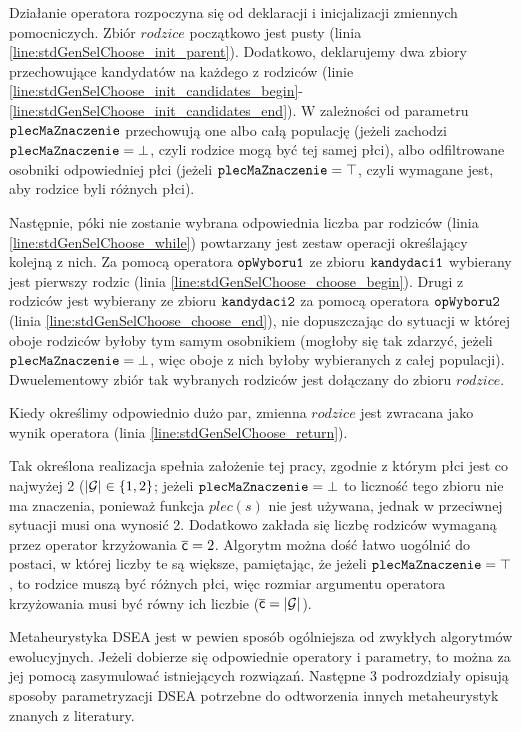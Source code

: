 \documentclass[./FM_mgr.tex]{subfiles}
\begin{document}
Działanie operatora rozpoczyna się od deklaracji i inicjalizacji zmiennych pomocniczych.
Zbiór $rodzice$ początkowo jest pusty (linia \ref{line:stdGenSelChoose_init_parent}).
Dodatkowo, deklarujemy dwa zbiory przechowujące kandydatów na każdego z rodziców (linie \ref{line:stdGenSelChoose_init_candidates_begin}-\ref{line:stdGenSelChoose_init_candidates_end}).
W zależności od parametru $\mathtt{plecMaZnaczenie}$ przechowują one albo całą populację (jeżeli zachodzi $\mathtt{plecMaZnaczenie} = \bot$, czyli rodzice mogą być tej samej płci), albo odfiltrowane osobniki odpowiedniej płci (jeżeli $\mathtt{plecMaZnaczenie} = \top$, czyli wymagane jest, aby rodzice byli różnych płci).

Następnie, póki nie zostanie wybrana odpowiednia liczba par rodziców (linia \ref{line:stdGenSelChoose_while}) powtarzany jest zestaw operacji określający kolejną z nich.
Za pomocą operatora $\mathtt{opWyboru1}$ ze zbioru $\mathtt{kandydaci1}$ wybierany jest pierwszy rodzic (linia \ref{line:stdGenSelChoose_choose_begin}).
Drugi z rodziców jest wybierany ze zbioru $\mathtt{kandydaci2}$ za pomocą operatora $\mathtt{opWyboru2}$  (linia \ref{line:stdGenSelChoose_choose_end}), nie dopuszczając do sytuacji w której oboje rodziców byłoby tym samym osobnikiem (mogłoby się tak zdarzyć, jeżeli $\mathtt{plecMaZnaczenie} = \bot$, więc oboje z nich byłoby wybieranych z całej populacji).
Dwuelementowy zbiór tak wybranych rodziców jest dołączany do zbioru $rodzice$.


Kiedy określimy odpowiednio dużo par, zmienna $rodzice$ jest zwracana jako wynik operatora (linia \ref{line:stdGenSelChoose_return}).

Tak określona realizacja spełnia założenie tej pracy, zgodnie z którym płci jest co najwyżej 2 ($|\mathcal{G}| \in \{ 1, 2 \}$; jeżeli $\mathtt{plecMaZnaczenie} = \bot$ to liczność tego zbioru nie ma znaczenia, ponieważ funkcja $plec(s)$ nie jest używana, jednak w przeciwnej sytuacji musi ona wynosić 2.
Dodatkowo zakłada się liczbę rodziców wymaganą przez operator krzyżowania $\mathsf{\overline{c}}=2$.
Algorytm można dość łatwo uogólnić do postaci, w której liczby te są większe, pamiętając, że jeżeli $\mathtt{plecMaZnaczenie} = \top$, to rodzice muszą być różnych płci, więc rozmiar argumentu operatora krzyżowania musi być równy ich liczbie ($\mathsf{\overline{c}} = |\mathcal{G}|$).

\newpage

Metaheurystyka DSEA jest w pewien sposób ogólniejsza od zwykłych algorytmów ewolucyjnych.
Jeżeli dobierze się odpowiednie operatory i parametry, to można za jej pomocą zasymulować istniejących rozwiązań.
Następne 3 podrozdziały opisują sposoby parametryzacji DSEA potrzebne do odtworzenia innych metaheurystyk znanych z literatury.
\end{document}
